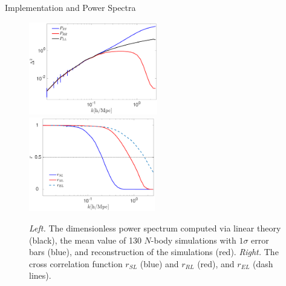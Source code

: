\begin{section}{Implementation and Power Spectra}
  \begin{figure}
    \centering
    \includegraphics[width=0.5\textwidth]{fig2a.pdf}
    \includegraphics[width=0.49\textwidth]{fig2b.pdf}
    \caption{{\it Left.} The dimensionless power spectrum computed via
      linear theory (black), the mean value of 130 $N$-body
      simulations with $1\sigma$ error bars (blue), and reconstruction
      of the simulations (red).  {\it Right.} The cross correlation
      function $r_{SL}$ (blue) and
      $r_{RL}$ (red), and $r_{EL}$ (dash
      lines).}
    \label{fig:cp}
  \end{figure}


\end{section}

